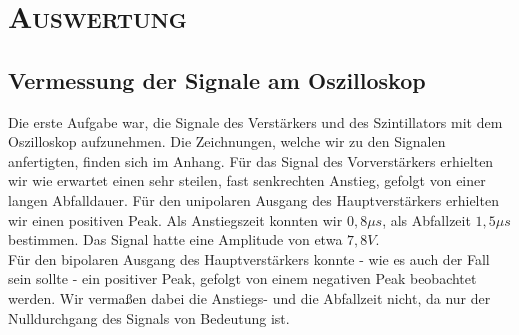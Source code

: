 \clearpage
\section{\textsc{Auswertung}}
\subsection{Vermessung der Signale am Oszilloskop}
Die erste Aufgabe war, die Signale des Verstärkers und des Szintillators mit dem Oszilloskop aufzunehmen. Die Zeichnungen, welche wir zu den Signalen anfertigten, finden sich im Anhang. Für das Signal des Vorverstärkers erhielten wir wie erwartet einen sehr steilen, fast senkrechten Anstieg, gefolgt von einer langen Abfalldauer. Für den unipolaren Ausgang des Hauptverstärkers erhielten wir einen positiven Peak. Als Anstiegszeit konnten wir $0,8 \mu s$, als Abfallzeit $1,5 \mu s$ bestimmen. Das Signal hatte eine Amplitude von etwa $7,8 V$. \\
Für den bipolaren Ausgang des Hauptverstärkers konnte - wie es auch der Fall sein sollte - ein positiver Peak, gefolgt von einem negativen Peak beobachtet werden. Wir vermaßen dabei die Anstiegs- und die Abfallzeit nicht, da nur der Nulldurchgang des Signals von Bedeutung ist.\\
